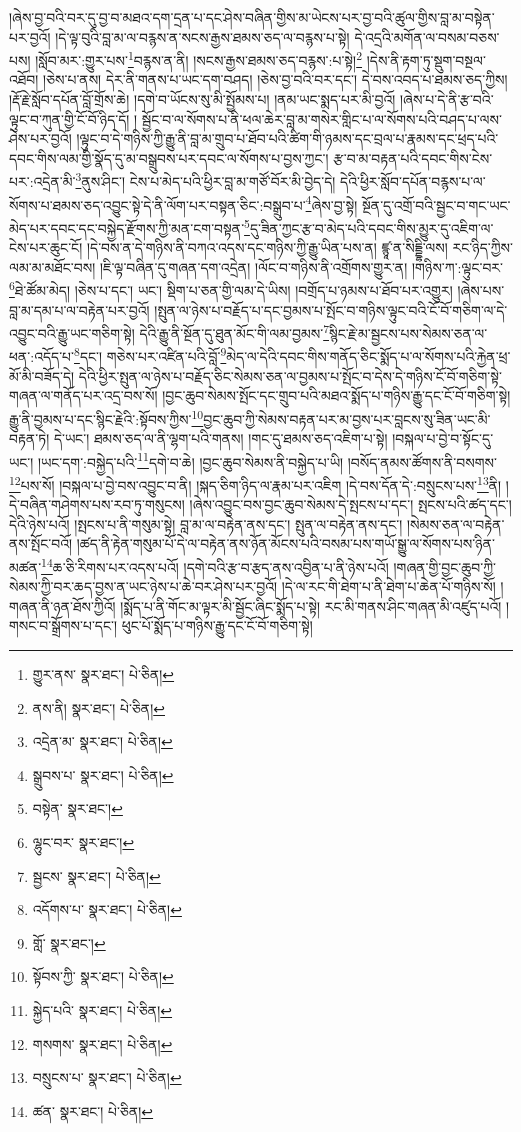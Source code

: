 །ཞེས་བྱ་བའི་བར་དུ་བྱ་བ་མཐའ་དག་དྲན་པ་དང་ཤེས་བཞིན་གྱིས་མ་ཡེངས་པར་བྱ་བའི་ཚུལ་གྱིས་བླ་མ་བསྟེན་པར་བྱའོ། །དེ་ལྟ་བུའི་བླ་མ་ལ་བརྙས་ན་སངས་རྒྱས་ཐམས་ཅད་ལ་བརྙས་པ་སྟེ། དེ་འདྲའི་མགོན་ལ་བསམ་བཅས་པས། །སློབ་མར་:གྱུར་པས་\footnote{གྱུར་ནས་  སྣར་ཐང་།  པེ་ཅིན། }བརྙས་ན་ནི། །སངས་རྒྱས་ཐམས་ཅད་བརྙས་:པ་སྟེ།\footnote{ནས་ནི།  སྣར་ཐང་།  པེ་ཅིན། } །དེས་ནི་རྟག་ཏུ་སྡུག་བསྔལ་འཐོབ། །ཅེས་པ་ནས། དེར་ནི་གནས་པ་ཡང་དག་བཤད། །ཅེས་བྱ་བའི་བར་དང་། དེ་བས་འབད་པ་ཐམས་ཅད་ཀྱིས། །རྡོ་རྗེ་སློབ་དཔོན་བློ་གྲོས་ཆེ། །དགེ་བ་ཡོངས་སུ་མི་སྤྱོམས་པ། །ནམ་ཡང་སྨད་པར་མི་བྱའོ། །ཞེས་པ་དེ་ནི་རྩ་བའི་ལྟུང་བ་ཀུན་གྱི་ངོ་བོ་ཉིད་དོ། །
སྦྱོང་བ་ལ་སོགས་པ་ནི་ཕལ་ཆེར་བླ་མ་གསེར་གླིང་པ་ལ་སོགས་པའི་བཤད་པ་ལས་ཤེས་པར་བྱའོ། །ལྟུང་བ་དེ་གཉིས་ཀྱི་རྒྱུ་ནི་བླ་མ་གྲུབ་པ་ཐོབ་པའི་ཚིག་གི་ཉམས་དང་བྲལ་པ་རྣམས་དང་ཕྲད་པའི་དབང་གིས་ལམ་གྱི་སྣོད་དུ་མ་བསྒྲུབས་པར་དབང་ལ་སོགས་པ་བྱས་ཀྱང་། རྩ་བ་མ་བརྟན་པའི་དབང་གིས་ངེས་པར་:འདྲེན་མི་\footnote{འདྲེན་མ་  སྣར་ཐང་།  པེ་ཅིན། }ནུས་ཤིང་། ངེས་པ་མེད་པའི་ཕྱིར་བླ་མ་གཙོ་བོར་མི་བྱེད་དེ། དེའི་ཕྱིར་སློབ་དཔོན་བརྙས་པ་ལ་སོགས་པ་ཐམས་ཅད་འབྱུང་སྟེ་དེ་ནི་ལོག་པར་བསྟན་ཅིང་:བསྒྲུབ་པ་\footnote{སྒྲུབས་པ་  སྣར་ཐང་།  པེ་ཅིན། }ཞེས་བྱ་སྟེ། སྔོན་དུ་འགྲོ་བའི་སྦྱང་བ་གང་ཡང་མེད་པར་དབང་དང་བསྐྱེད་རྫོགས་ཀྱི་མན་ངག་བསྟན་\footnote{བསྟེན་  སྣར་ཐང་། }དུ་ཟིན་ཀྱང་རྩ་བ་མེད་པའི་དབང་གིས་མྱུར་དུ་འཇིག་ལ་ངེས་པར་ཆུང་ངོ། །དེ་བས་ན་དེ་གཉིས་ནི་བཀའ་འདས་དང་གཉིས་ཀྱི་རྒྱུ་ཡིན་པས་ན། ཛྙཱ་ན་སིདྡྷི་ལས། རང་ཉིད་ཀྱིས་ལམ་མ་མཐོང་བས། །ཇི་ལྟ་བཞིན་དུ་གཞན་དག་འདྲེན། །ལོང་བ་གཉིས་ནི་འགྲོགས་གྱུར་ན། །གཉིས་ཀ་:ལྟུང་བར་\footnote{ལྷུང་བར་  སྣར་ཐང་། }ཐེ་ཚོམ་མེད། །ཅེས་པ་དང་། ཡང་། སྡིག་པ་ཅན་གྱི་ལམ་དེ་ཡིས། །བགྲོད་པ་ཉམས་པ་ཐོབ་པར་འགྱུར། །ཞེས་པས་བླ་མ་དམ་པ་ལ་བརྟེན་པར་བྱའོ། །སྤུན་ལ་ཉེས་པ་བརྗོད་པ་དང་བྱམས་པ་སྤོང་བ་གཉིས་ལྟུང་བའི་ངོ་བོ་གཅིག་ལ་དེ་འབྱུང་བའི་རྒྱུ་ཡང་གཅིག་སྟེ། དེའི་རྒྱུ་ནི་སྔོན་དུ་ཐུན་མོང་གི་ལམ་བྱམས་\footnote{སྦྱངས་  སྣར་ཐང་།  པེ་ཅིན། }སྙིང་རྗེ་མ་སྦྱངས་པས་སེམས་ཅན་ལ་ཕན་:འདོད་པ་\footnote{འདོགས་པ་  སྣར་ཐང་།  པེ་ཅིན། }དང་། གཅེས་པར་འཛིན་པའི་བློ་\footnote{གློ་  སྣར་ཐང་། }མེད་ལ་དེའི་དབང་གིས་གནོད་ཅིང་སྨོད་པ་ལ་སོགས་པའི་རྐྱེན་ཕྲ་མོ་མི་བཟོད་དེ། དེའི་ཕྱིར་སྤུན་ལ་ཉེས་པ་བརྗོད་ཅིང་སེམས་ཅན་ལ་བྱམས་པ་སྤོང་བ་དེས་དེ་གཉིས་ངོ་བོ་གཅིག་སྟེ་གཞན་ལ་གནོད་པར་འདྲ་བས་སོ། །བྱང་ཆུབ་སེམས་སྤོང་དང་གྲུབ་པའི་མཐའ་སྨོད་པ་གཉིས་རྒྱུ་དང་ངོ་བོ་གཅིག་སྟེ། རྒྱུ་ནི་བྱམས་པ་དང་སྙིང་རྗེའི་:སྟོབས་ཀྱིས་\footnote{སྟོབས་ཀྱི་  སྣར་ཐང་།  པེ་ཅིན། }བྱང་ཆུབ་ཀྱི་སེམས་བརྟན་པར་མ་བྱས་པར་བླངས་སུ་ཟིན་ཡང་མི་བརྟན་ཏེ། དེ་ཡང་། ཐམས་ཅད་ལ་ནི་ལྷག་པའི་གནས། །གང་དུ་ཐམས་ཅད་འཇིག་པ་སྟེ། །བསྐལ་པ་བྱེ་བ་སྟོང་དུ་ཡང་། །ཡང་དག་:བསྐྱེད་པའི་\footnote{སྐྱེད་པའི་  སྣར་ཐང་།  པེ་ཅིན། }དགེ་བ་ཆེ། །བྱང་ཆུབ་སེམས་ནི་བསྐྱེད་པ་ཡི། །བསོད་ནམས་ཚོགས་ནི་བསགས་\footnote{གསགས་  སྣར་ཐང་།  པེ་ཅིན། }པས་སོ། །བསྐལ་པ་བྱེ་བས་འབྱུང་བ་ནི། །སྐད་ཅིག་ཉིད་ལ་རྣམ་པར་འཇིག །དེ་བས་དོན་དེ་:བསྲུངས་པས་\footnote{བསྲུངས་པ་  སྣར་ཐང་།  པེ་ཅིན། }ནི། །དེ་བཞིན་གཤེགས་པས་རབ་ཏུ་གསུངས། །ཞེས་འབྱུང་བས་བྱང་ཆུབ་སེམས་དེ་སྤངས་པ་དང་། སྤངས་པའི་ཚད་དང་། དེའི་ཉེས་པའོ། །སྤངས་པ་ནི་གསུམ་སྟེ། བླ་མ་ལ་བརྟེན་ནས་དང་། སྤུན་ལ་བརྟེན་ནས་དང་། །སེམས་ཅན་ལ་བརྟེན་ནས་སྤོང་བའོ། །ཚད་ནི་རྟེན་གསུམ་པོ་དེ་ལ་བརྟེན་ནས་ཉོན་མོངས་པའི་བསམ་པས་གཡོ་སྒྱུ་ལ་སོགས་པས་ཉིན་མཚན་\footnote{ཚན་  སྣར་ཐང་།  པེ་ཅིན། }ཆ་ཅི་རིགས་པར་འདས་པའོ། །དགེ་བའི་རྩ་བ་རྩད་ནས་འབྱིན་པ་ནི་ཉེས་པའོ། །གཞན་གྱི་བྱང་ཆུབ་ཀྱི་སེམས་ཀྱི་བར་ཆད་བྱས་ན་ཡང་ཉེས་པ་ཆེ་བར་ཤེས་པར་བྱའོ། །དེ་ལ་རང་གི་ཐེག་པ་ནི་ཐེག་པ་ཆེན་པོ་གཉིས་སོ། །གཞན་ནི་ཉན་ཐོས་ཀྱིའོ། །སྨོད་པ་ནི་གོང་མ་ལྟར་མི་སྦྱོང་ཞིང་སྨོད་པ་སྟེ། རང་མི་གནས་ཤིང་གཞན་མི་འཛུད་པའོ། །གསང་བ་སྒྲོགས་པ་དང་། ཕུང་པོ་སྨོད་པ་གཉིས་རྒྱུ་དང་ངོ་བོ་གཅིག་སྟེ། 